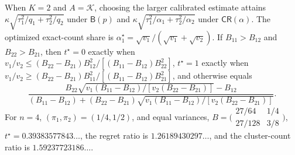 When \(K=2\) and \(A=\mathcal K\), choosing the larger calibrated estimate attains \(\kappa\sqrt{\tau_1^2/q_1+\tau_2^2/q_2}\) under \(\mathsf B(p)\) and \(\kappa\sqrt{\tau_1^2/\alpha_1+\tau_2^2/\alpha_2}\) under \(\mathsf{CR}(\alpha)\). The optimized exact-count share is \(\alpha_1^\star=\sqrt{v_1}/(\sqrt{v_1}+\sqrt{v_2})\). If \(B_{11}>B_{12}\) and \(B_{22}>B_{21}\), then \(t^\star=0\) exactly when \(v_1/v_2\leq(B_{22}-B_{21})B_{12}^2/[(B_{11}-B_{12})B_{22}^2]\), \(t^\star=1\) exactly when \(v_1/v_2\geq(B_{22}-B_{21})B_{11}^2/[(B_{11}-B_{12})B_{21}^2]\), and otherwise equals \[\frac{B_{22}\sqrt{v_1(B_{11}-B_{12})/[v_2(B_{22}-B_{21})]}-B_{12}}{(B_{11}-B_{12})+(B_{22}-B_{21})\sqrt{v_1(B_{11}-B_{12})/[v_2(B_{22}-B_{21})]}}.\] For \(n=4\), \((\pi_1,\pi_2)=(1/4,1/2)\), and equal variances, \(B=\bigl(\begin{smallmatrix}27/64&1/4\\27/128&3/8\end{smallmatrix}\bigr)\), \(t^\star=0.39383577843\ldots\), the regret ratio is \(1.26189430297\ldots\), and the cluster-count ratio is \(1.59237723186\ldots\).